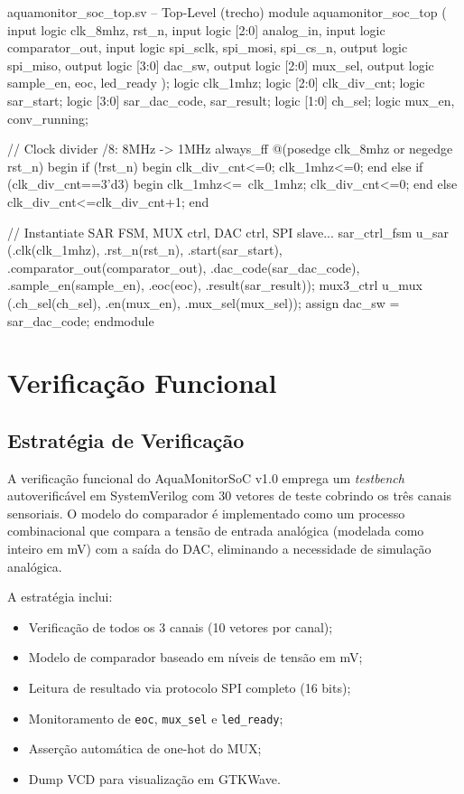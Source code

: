 \documentclass[12pt,a4paper]{article}
\begin{document}
\begin{svcode}{aquamonitor\_soc\_top.sv -- Top-Level (trecho)}
module aquamonitor_soc_top (
    input  logic clk_8mhz, rst_n,
    input  logic [2:0] analog_in,
    input  logic comparator_out,
    input  logic spi_sclk, spi_mosi, spi_cs_n,
    output logic spi_miso,
    output logic [3:0] dac_sw,
    output logic [2:0] mux_sel,
    output logic sample_en, eoc, led_ready
);
    logic clk_1mhz;    logic [2:0] clk_div_cnt;
    logic sar_start;   logic [3:0] sar_dac_code, sar_result;
    logic [1:0] ch_sel; logic mux_en, conv_running;

    // Clock divider /8: 8MHz -> 1MHz
    always_ff @(posedge clk_8mhz or negedge rst_n) begin
        if (!rst_n) begin clk_div_cnt<=0; clk_1mhz<=0; end
        else if (clk_div_cnt==3'd3) begin
            clk_1mhz<=~clk_1mhz; clk_div_cnt<=0;
        end else clk_div_cnt<=clk_div_cnt+1;
    end

    // Instantiate SAR FSM, MUX ctrl, DAC ctrl, SPI slave...
    sar_ctrl_fsm u_sar (.clk(clk_1mhz), .rst_n(rst_n),
        .start(sar_start), .comparator_out(comparator_out),
        .dac_code(sar_dac_code), .sample_en(sample_en),
        .eoc(eoc), .result(sar_result));
    mux3_ctrl u_mux (.ch_sel(ch_sel), .en(mux_en), .mux_sel(mux_sel));
    assign dac_sw = sar_dac_code;
endmodule
\end{svcode}

\newpage

\section{Verificação Funcional}
\label{sec:verificacao}

\subsection{Estratégia de Verificação}

A verificação funcional do AquaMonitorSoC v1.0 emprega um \textit{testbench}
autoverificável em SystemVerilog com 30 vetores de teste cobrindo os três canais
sensoriais. O modelo do comparador é implementado como um processo combinacional
que compara a tensão de entrada analógica (modelada como inteiro em mV) com a
saída do DAC, eliminando a necessidade de simulação analógica.

A estratégia inclui:
\begin{itemize}
  \item Verificação de todos os 3 canais (10 vetores por canal);
  \item Modelo de comparador baseado em níveis de tensão em mV;
  \item Leitura de resultado via protocolo SPI completo (16 bits);
  \item Monitoramento de \texttt{eoc}, \texttt{mux\_sel} e \texttt{led\_ready};
  \item Asserção automática de one-hot do MUX;
  \item Dump VCD para visualização em GTKWave.
\end{itemize}
\end{document}
